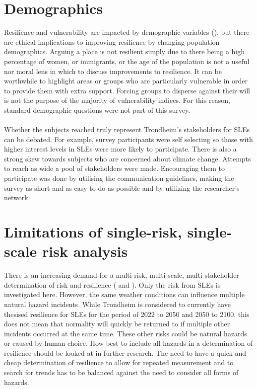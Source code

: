 \paragraph{}



\section{Demographics}
Resilience and vulnerability are impacted by demographic variables (\cite{rod_integrated_2012}), but there are ethical implications to improving resilience by changing population demographics. Arguing a place is not resilient simply due to there being a high percentage of women, or immigrants, or the age of the population is not a useful nor moral lens in which to discuss improvements to resilience. It can be worthwhile to highlight areas or groups who are particularly vulnerable in order to provide them with extra support. Forcing groups to disperse against their will is not the purpose of the majority of vulnerability indices. For this reason, standard demographic questions were not part of this survey. 


\paragraph{}
Whether the subjects reached truly represent Trondheim's stakeholders for SLEs can be debated. For example, survey participants were self selecting so those with higher interest levels in SLEs were more likely to participate. There is also a strong skew towards subjects who are concerned about climate change. Attempts to reach as wide a pool of stakeholders were made. Encouraging them to participate was done by utilising the communication guidelines, making the survey as short and as easy to do as possible and by utilizing the researcher's network. 



\section{Limitations of single-risk, single-scale risk analysis}
There is an increasing demand for a multi-risk, multi-scale, multi-stakeholder determination of risk and resilience (\cite{gerkensmeier_governing_2018} and \cite{cutter_community_2020}).  Only the risk from SLEs is investigated here. However, the same weather conditions can influence multiple natural hazard incidents. While Trondheim is considered to currently have thesised resilience for SLEs for the period of 2022 to 2050 and 2050 to 2100, this does not mean that normality will quickly be returned to if multiple other incidents occurred at the same time. These other risks could be natural hazards or caused by human choice. How best to include all hazards in a determination of resilience should be looked at in further research. The need to have a quick and cheap determination of resilience to allow for repeated measurement and to search for trends has to be balanced against the need to consider all forms of hazards. 
